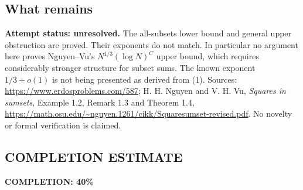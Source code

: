 \subsection*{What remains}
\textbf{Attempt status: unresolved.} The all-subsets lower bound and general upper obstruction are proved. Their exponents do not match. In particular no argument here proves Nguyen--Vu's $N^{1/3}(\log N)^C$ upper bound, which requires considerably stronger structure for subset sums. The known exponent $1/3+o(1)$ is not being presented as derived from (1).
Sources: \url{https://www.erdosproblems.com/587}; H. H. Nguyen and V. H. Vu, \emph{Squares in sumsets}, Example 1.2, Remark 1.3 and Theorem 1.4, \url{https://math.osu.edu/~nguyen.1261/cikk/Squaresumset-revised.pdf}. No novelty or formal verification is claimed.

\subsection*{COMPLETION ESTIMATE}
\textbf{COMPLETION: 40\%}
